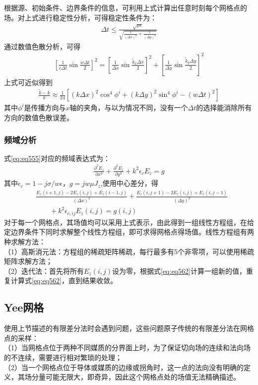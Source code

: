 \documentclass{article}
\numberwithin{equation}{section}
\begin{document}
根据源、初始条件、边界条件的信息，可利用上式计算出任意时刻每个网格点的场。对上式进行稳定性分析，可得稳定性条件为：
\begin{align}
    \label{eq:eq558}
    \Delta t\leq\frac{\sqrt{\mu\epsilon}}{\sqrt{\frac{1}{(\Delta x)^2}+\frac{1}{(\Delta y)^2}}}
\end{align}
通过数值色散分析，可得
\begin{align}
    \label{eq:eq559}
    \left[\frac{1}{c\Delta t}\sin\frac{w\Delta t}{2}\right]^2=\left[\frac{1}{\Delta x}\sin\frac{\tilde{k}_x\Delta x}{2}\right]^2+\left[\frac{1}{\Delta y}\sin\frac{\tilde{k}_y\Delta y}{2}\right]^2
\end{align}
上式可近似得到
\begin{align}
    \label{eq:eq560}
    \frac{\tilde{k}-k}{k}\approx\frac{1}{24}\left[(k\Delta x)^2\cos^4\phi^i+(k\Delta y)^2\sin^4\phi^i-(w\Delta t)^2\right]
\end{align}
其中$\phi^i$是传播方向与$x$轴的夹角，与以为情况不同，没有一个$\Delta t$的选择能消除所有方向的数值色散误差。
\subsubsection{频域分析}
式\ref{eq:eq555}对应的频域表达式为：
\begin{align}
    \label{eq:eq561}
    \frac{\partial^2 {E}_z}{\partial x^2}+\frac{\partial^2 {E}_z}{\partial y^2}+k^2\epsilon_cE_z=g
\end{align}
其中$\epsilon_c=1-j\sigma/w\epsilon$，$g=jw\mu{J}_{z}$,使用中心差分，得
\begin{align}
    \label{eq:eq562}
    &\frac{E_z(i+1,j)-2E_z(i,j)+E_z(i-1,j)}{(\Delta x)^2}+\frac{E_z(i,j+1)-2E_z(i,j)+E_z(i,j-1)}{(\Delta y)^2} \nonumber \\
    &\qquad+k^2\epsilon_{c,ij}E_z(i,j)=g(i,j)
\end{align}
对于每一个网格点，其场值均可以采用上式表示，由此得到一组线性方程组，在给定边界条件下同时求解整个线性方程组，即可求得网格点得场值。线性方程组有两种求解方法：\\
（1）高斯消元法：方程组的稀疏矩阵稀疏，每行最多有5个非零项，可以使用稀疏矩阵求解方法； \\
（2）迭代法：首先将所有$E_z(i,j)$设为零，根据式\ref{eq:eq562}计算一组新的值，重复计算式\ref{eq:eq562}，直到结果收敛。
\subsection{Yee网格}
使用上节描述的有限差分法时会遇到问题，这些问题原子传统的有限差分法在网格点的采样：\\
（1）当网格点位于两种不同媒质的分界面上时，为了保证切向场的连续和法向场的不连续，需要进行相对繁琐的处理；\\
（2）当一个网格点位于导体或媒质的边缘或拐角时，这一点的法向没有明确的定义，其场分量可能无限大，即奇异，因此这个网格点处的场值无法精确描述。
\end{document}
